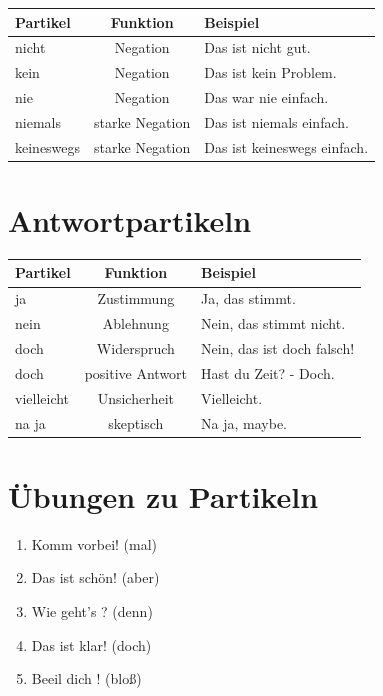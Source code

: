 \begin{center}
\begin{tabular}{|l|c|l|}
\hline
\textbf{Partikel} & \textbf{Funktion} & \textbf{Beispiel} \\ \hline
nicht & Negation & Das ist nicht gut. \\ \hline
kein & Negation & Das ist kein Problem. \\ \hline
nie & Negation & Das war nie einfach. \\ \hline
niemals & starke Negation & Das ist niemals einfach. \\ \hline
keineswegs & starke Negation & Das ist keineswegs einfach. \\ \hline
\end{tabular}
\end{center}

\section{Antwortpartikeln}
\label{sec:Antwortpartikeln}

\begin{center}
\begin{tabular}{|l|c|l|}
\hline
\textbf{Partikel} & \textbf{Funktion} & \textbf{Beispiel} \\ \hline
ja & Zustimmung & Ja, das stimmt. \\ \hline
nein & Ablehnung & Nein, das stimmt nicht. \\ \hline
doch & Widerspruch & Nein, das ist doch falsch! \\ \hline
doch & positive Antwort & Hast du Zeit? - Doch. \\ \hline
vielleicht & Unsicherheit & Vielleicht. \\ \hline
na ja & skeptisch & Na ja, maybe. \\ \hline
\end{tabular}
\end{center}

\section{Übungen zu Partikeln}
\label{sec:PartikelnUebungen}

\begin{enumerate}
    \item Komm \underline{\hspace{1cm}} vorbei! (mal)
    \item Das ist \underline{\hspace{1cm}} schön! (aber)
    \item Wie geht's \underline{\hspace{1cm}}? (denn)
    \item Das ist \underline{\hspace{1cm}} klar! (doch)
    \item Beeil dich \underline{\hspace{1cm}}! (bloß)
\end{enumerate}

\chapterend